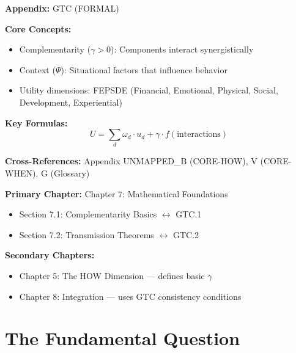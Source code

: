 \begin{tcolorbox}[colback=blue!5!white, colframe=blue!75!black,
    title=Quick Reference: General Theory of Complementarity (GTC)]

\textbf{Appendix:} GTC (FORMAL)

\textbf{Core Concepts:}
\begin{itemize}[nosep]
\item Complementarity ($\gamma > 0$): Components interact synergistically
\item Context ($\Psi$): Situational factors that influence behavior
\item Utility dimensions: FEPSDE (Financial, Emotional, Physical, Social, Development, Experiential)
\end{itemize}

\textbf{Key Formulas:}
\begin{equation}
U = \sum_d \omega_d \cdot u_d + \gamma \cdot f(\text{interactions})
\end{equation}

\textbf{Cross-References:} Appendix UNMAPPED_B (CORE-HOW), V (CORE-WHEN), G (Glossary)
\end{tcolorbox}

\begin{tcolorbox}[colback=purple!5!white, colframe=purple!75!black,
    title=Chapter Linkage]

\textbf{Primary Chapter:} Chapter 7: Mathematical Foundations
\begin{itemize}[nosep]
\item Section 7.1: Complementarity Basics $\leftrightarrow$ GTC.1
\item Section 7.2: Transmission Theorems $\leftrightarrow$ GTC.2
\end{itemize}

\textbf{Secondary Chapters:}
\begin{itemize}[nosep]
\item Chapter 5: The HOW Dimension --- defines basic $\gamma$
\item Chapter 8: Integration --- uses GTC consistency conditions
\end{itemize}

\end{tcolorbox}

\section{The Fundamental Question}
\label{sec:gtc-fundamental}

